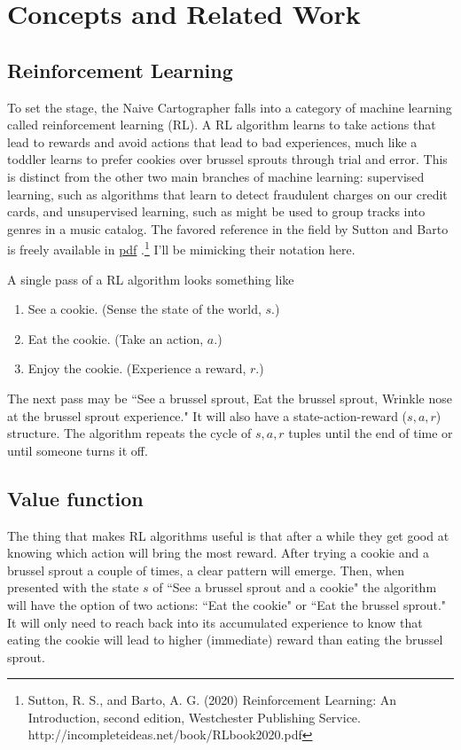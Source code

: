 \section{Concepts and Related Work}
\label{sec:background}

\subsection{Reinforcement Learning}
\label{subsec:reinforcementlearning}

To set the stage, the Naive Cartographer falls into
a category of machine learning
called reinforcement learning (RL). A RL algorithm learns to take actions
that lead to rewards and avoid actions that lead to bad experiences,
much like a toddler learns to prefer cookies over brussel sprouts
through trial and error. This is distinct from the other two main
branches of machine learning: supervised learning, such as algorithms
that learn to detect fraudulent charges on our credit cards,
and unsupervised learning, such as might be used to group tracks
into genres in a music catalog. The favored reference in the field by
Sutton and Barto is freely available
in \href{http://incompleteideas.net/book/RLbook2020.pdf}{pdf}
.\footnote{Sutton, R. S., and Barto, A. G. (2020) Reinforcement Learning:
An Introduction, second edition, Westchester Publishing Service.
http://incompleteideas.net/book/RLbook2020.pdf }
I'll be mimicking their notation here.

A single pass of a RL algorithm looks something like
\begin{enumerate}
  \item{See a cookie. (Sense the state of the world, $s$.)}
  \item{Eat the cookie. (Take an action, $a$.)}
  \item{Enjoy the cookie. (Experience a reward, $r$.)}
\end{enumerate}
The next pass may be ``See a brussel sprout, Eat the brussel sprout,
Wrinkle nose at the brussel sprout experience." It will also have a
state-action-reward ($s, a, r$) structure. The algorithm repeats
the cycle of $s, a, r$ tuples until the end of time or until someone
turns it off.

\subsection{Value function}
\label{subsec:introvaluefunction}
The thing that makes RL algorithms useful is that after a while they
get good at knowing which action will bring the most reward.
After trying a cookie and a brussel sprout a couple of times,
a clear pattern will emerge. Then, when presented with the state $s$ of
``See a brussel sprout and a cookie" the algorithm will have the option
of two actions: ``Eat the cookie" or ``Eat the brussel sprout."
It will only need to reach back into its accumulated experience to know
that eating the cookie will lead to higher (immediate) reward than eating
the brussel sprout.

